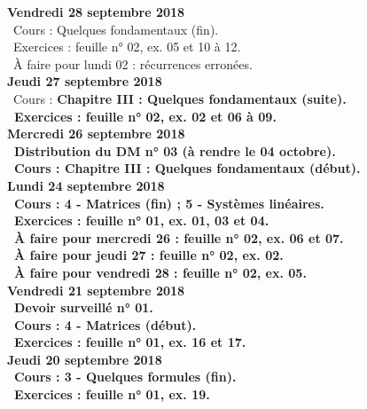 \documentclass[12pt,a4paper]{article}
\begin{document}
\noindent\textbf{Vendredi 28 septembre 2018}\\
\bu\ Cours : Quelques fondamentaux (fin).\\
\bu\ Exercices : feuille n° 02, ex. 05 et 10 à 12.\\
\bu\ À faire pour lundi 02 : récurrences erronées.\vspace{.4cm}\\

\noindent\textbf{Jeudi 27 septembre 2018}\\
\bu\ Cours : \bf Chapitre III \rm : Quelques fondamentaux (suite).\\
\bu\ Exercices : feuille n° 02, ex. 02 et 06 à 09.\vspace{.4cm}\\

\noindent\textbf{\bf Mercredi 26 septembre 2018}\\
\bu\ Distribution du DM n° 03 (à rendre le 04 octobre).\\
\bu\ Cours : \bf Chapitre III \rm : Quelques fondamentaux (début).\vspace{.4cm}\\

\noindent\textbf{\bf Lundi 24 septembre 2018}\\
\bu\ Cours : 4 - Matrices (fin) ; 5 - Systèmes linéaires.\\
\bu\ Exercices : feuille n° 01, ex. 01, 03 et 04.\\
\bu\ À faire pour mercredi 26 : feuille n° 02, ex. 06 et 07.\\
\bu\ À faire pour jeudi 27 : feuille n° 02, ex. 02.\\
\bu\ À faire pour vendredi 28 : feuille n° 02, ex. 05.\vspace{.4cm}\\ 

\noindent\textbf{Vendredi 21 septembre 2018}\\
\bu\ Devoir surveillé n° 01.\\
\bu\ Cours : 4 - Matrices (début).\\
\bu\ Exercices : feuille n° 01, ex. 16 et 17.\vspace{.4cm}\\
 
\noindent\textbf{Jeudi 20 septembre 2018}\\
\bu\ Cours : 3 - Quelques formules (fin).\\
\bu\ Exercices : feuille n° 01, ex. 19.\vspace{.4cm}\\
\end{document}
